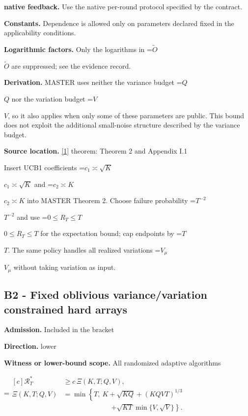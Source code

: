 \documentclass[10pt,a4paper]{article}
\newcommand{\AtlasMath}[1]{\par\begingroup\centering\setbox0=\hbox{$\displaystyle #1$}\ifdim\wd0>1.4\linewidth\typeout{ATLAS WIDE FORMULA: \the\wd0}\fi\ifdim\wd0>\linewidth\resizebox{\linewidth}{!}{\box0}\else\box0\fi\par\endgroup}
\newcommand{\AtlasInlineMath}[1]{\begingroup\setbox0=\hbox{$#1$}\ifdim\wd0>.4\linewidth\endgroup\AtlasMath{#1}\else\endgroup$#1$\fi}
\begin{document}
\textbf{native feedback.} Use the native per-round protocol specified by the contract.



\textbf{Constants.} Dependence is allowed only on parameters declared fixed in the applicability conditions.



\textbf{Logarithmic factors.} Only the logarithms in \AtlasInlineMath{\widetilde O} are suppressed; see the evidence record.



\textbf{Derivation.} MASTER uses neither the variance budget \AtlasInlineMath{Q} nor the variation budget \AtlasInlineMath{V}, so it also applies when only some of these parameters are public. This bound does not exploit the additional small-noise structure described by the variance budget.



\textbf{Source location.} \href{https://proceedings.mlr.press/v134/wei21b.html}{[1]} theorem: Theorem 2 and Appendix I.1



Insert UCB1 coefficients \AtlasInlineMath{c_1\asymp\sqrt K} and \AtlasInlineMath{c_2\asymp K} into MASTER Theorem 2. Choose failure probability \AtlasInlineMath{T^{-2}} and use \AtlasInlineMath{0\le R_T\le T} for the expectation bound; cap endpoints by \AtlasInlineMath{T}. The same policy handles all realized variations \AtlasInlineMath{V_\mu} without taking variation as input.



\subsection{B2 - Fixed oblivious variance/variation constrained hard arrays}


\textbf{Admission.} Included in the bracket



\textbf{Direction.} lower



\textbf{Witness or lower-bound scope.} All randomized adaptive algorithms



\AtlasMath{\begin{aligned}[c]\mathcal{R}_T^*&\ge c\,\Xi(K,T;Q,V),\\ \Xi(K,T;Q,V)&=\min\left\{T,\ K+\sqrt{KQ}+(KQVT)^{1/3}\right.\\ &\hspace{7em}\left.+\sqrt{KT}\min\{V,\sqrt V\}\right\}.\end{aligned}}
\end{document}

